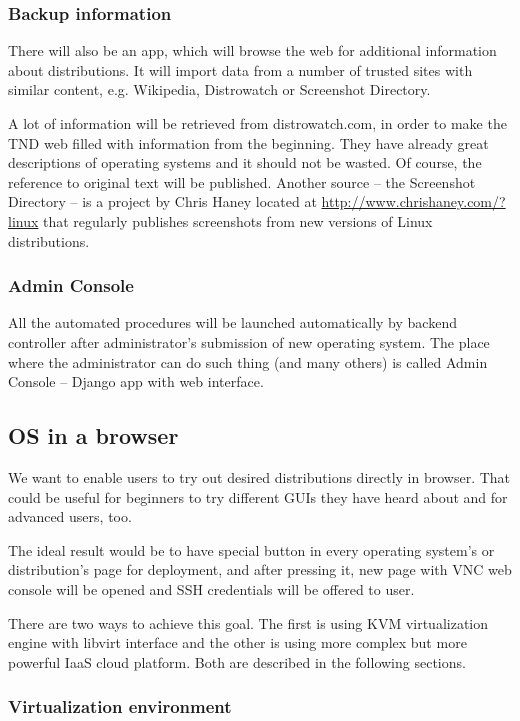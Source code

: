 \documentclass[thesis=B,english]{FITthesis}[2013/04/26]
\begin{document}
\subsubsection{Backup information}

There will also be an app, which will browse the web for additional information about distributions. It will import data from a number of trusted sites with similar content, e.g. Wikipedia, Distrowatch or Screenshot Directory.

A lot of information will be retrieved from distrowatch.com, in order to make the TND web filled with information from the beginning. They have already great descriptions of operating systems and it should not be wasted. Of course, the reference to original text will be published. Another source -- the Screenshot Directory -- is a project by Chris Haney located at \url{http://www.chrishaney.com/?linux} that regularly publishes screenshots from new versions of Linux distributions.

\subsubsection{Admin Console}

All the automated procedures will be launched automatically by backend controller after administrator's submission of new operating system. The place where the administrator can do such thing (and many others) is called Admin Console -- Django app with web interface.

\subsection{OS in a browser}

We want to enable users to try out desired distributions directly in browser. That could be useful for beginners to try different GUIs they have heard about and for advanced users, too.

The ideal result would be to have special button in every operating system's or distribution's page for deployment, and after pressing it, new page with VNC web console will be opened and SSH credentials will be offered to user.

There are two ways to achieve this goal. The first is using KVM virtualization engine with libvirt interface and the other is using more complex but more powerful IaaS cloud platform. Both are described in the following sections.

\subsubsection{Virtualization environment}
\end{document}

